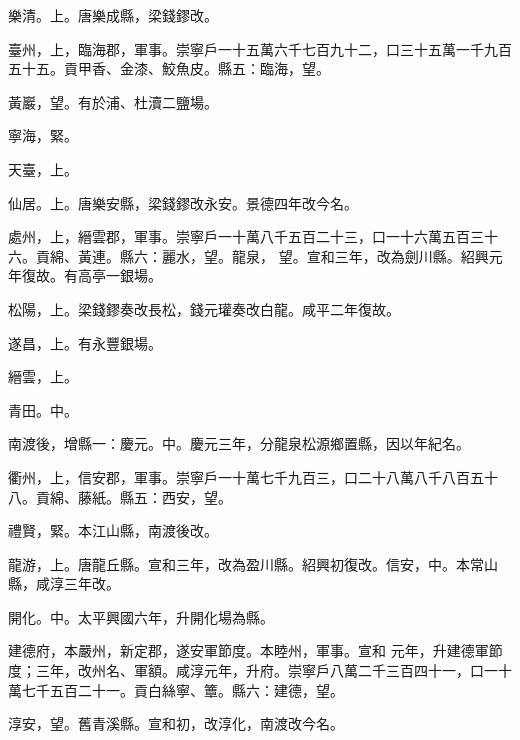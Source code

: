 \begin{pinyinscope}
 樂清。上。唐樂成縣，梁錢鏐改。



 臺州，上，臨海郡，軍事。崇寧戶一十五萬六千七百九十二，口三十五萬一千九百五十五。貢甲香、金漆、鮫魚皮。縣五：臨海，望。



 黃巖，望。有於浦、杜瀆二鹽場。



 寧海，緊。



 天臺，上。



 仙居。上。唐樂安縣，梁錢鏐改永安。景德四年改今名。



 處州，上，縉雲郡，軍事。崇寧戶一十萬八千五百二十三，口一十六萬五百三十六。貢綿、黃連。縣六：麗水，望。龍泉，
 望。宣和三年，改為劍川縣。紹興元年復故。有高亭一銀場。



 松陽，上。梁錢鏐奏改長松，錢元瓘奏改白龍。咸平二年復故。



 遂昌，上。有永豐銀場。



 縉雲，上。



 青田。中。



 南渡後，增縣一：慶元。中。慶元三年，分龍泉松源鄉置縣，因以年紀名。



 衢州，上，信安郡，軍事。崇寧戶一十萬七千九百三，口二十八萬八千八百五十八。貢綿、藤紙。縣五：西安，望。



 禮賢，緊。本江山縣，南渡後改。



 龍游，上。唐龍丘縣。宣和三年，改為盈川縣。紹興初復改。信安，中。本常山縣，咸淳三年改。



 開化。中。太平興國六年，升開化場為縣。



 建德府，本嚴州，新定郡，遂安軍節度。本睦州，軍事。宣和
 元年，升建德軍節度；三年，改州名、軍額。咸淳元年，升府。崇寧戶八萬二千三百四十一，口一十萬七千五百二十一。貢白絲寧、簟。縣六：建德，望。



 淳安，望。舊青溪縣。宣和初，改淳化，南渡改今名。




\end{pinyinscope}
